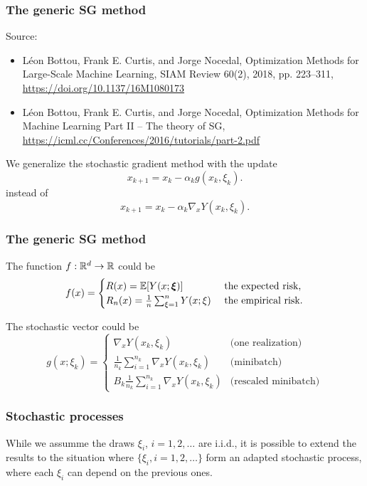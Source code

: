 \documentclass{beamer}
\def\bxi{\boldsymbol\xi}
\begin{document}
\begin{frame}
\frametitle{The generic SG method}

Source:
\begin{itemize}
\item 
Léon Bottou, Frank E. Curtis, and Jorge Nocedal, Optimization Methods for Large-Scale Machine Learning, SIAM Review 60(2), 2018, pp. 223--311, \url{https://doi.org/10.1137/16M1080173}
\item
Léon Bottou, Frank E. Curtis, and Jorge Nocedal, Optimization Methods for Machine Learning
Part II – The theory of SG, \url{https://icml.cc/Conferences/2016/tutorials/part-2.pdf}
\end{itemize}

\mbox{}

We generalize the stochastic gradient method with the update
$$
x_{k+1} = x_k - \alpha_k g(x_k, \xi_k).
$$
instead of
$$
x_{k+1} = x_k - \alpha_k \nabla_x Y(x_k, \xi_k).
$$

\end{frame}

\begin{frame}
\frametitle{The generic SG method}

The function $f: {\mathbb{R}}^d \rightarrow {\mathbb{R}}$ could be
$$
f(x) =
\begin{cases}
R(x) = \EE [ Y(x; \bxi) ] & \text{ the expected risk,} \\
R_n(x) = \frac{1}{n} \sum_{\xi = 1}^n Y(x; \xi) & \text{ the empirical risk.}
\end{cases}
$$

\mbox{}

The stochastic vector could be
$$
g(x; \xi_k) =
\begin{cases}
\nabla_x Y(x_k, \xi_k) & \text{(one realization)} \\
\frac{1}{n_k} \sum_{i = 1}^{n_k} \nabla_x Y(x_k, \xi_k) & \text{(minibatch)} \\
B_k \frac{1}{n_k} \sum_{i = 1}^{n_k} \nabla_x Y(x_k, \xi_k)
& \text{(rescaled minibatch)}
\end{cases}
$$

\end{frame}

\begin{frame}
\frametitle{Stochastic processes}

While we assumme the draws $\xi_i$, $i = 1,2,\ldots$ are i.i.d., it is possible to extend the results to the situation where $\lbrace \xi_i, i = 1,2,\ldots \rbrace$ form an adapted stochastic process, where each $\xi_i$ can depend on the previous ones.

\end{frame}
\end{document}
